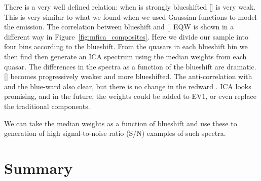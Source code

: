 There is a very well defined relation: when  is strongly blueshifted [] is very weak. 
This is very similar to what we found when we used Gaussian functions to model the emission. 
The correlation between  blueshift and [] EQW is shown in a different way in Figure~\ref{fig:mfica_composites}. 
Here we divide our sample into four bins according to the  blueshift. 
From the quasars in each  blueshift bin we then find then generate an ICA spectrum using the median weights from each quasar. 
The differences in the spectra as a function of the  blueshift are dramatic. 
[] becomes progressively weaker and more blueshifted.
The anti-correlation with  and the blue-ward  also clear, but there is no change in the redward . 
ICA looks promising, and in the future, the weights could be added to EV$1$, or even replace the traditional components. 

We can take the median weights as a function of blueshift and use these to generation of high signal-to-noise ratio (S/N) examples of such spectra. 

\section{Summary}

